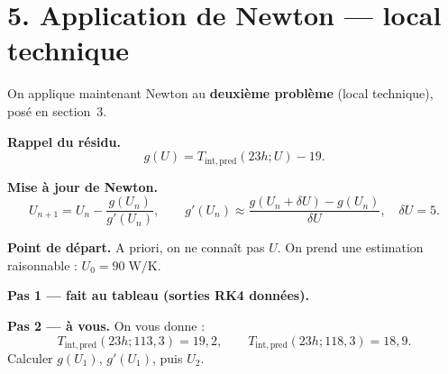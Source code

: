 \section*{5. Application de Newton --- local technique}

On applique maintenant Newton au \textbf{deuxième problème}
(local technique), posé en section~3.

\medskip

\textbf{Rappel du résidu.}
\[
  g(U)=T_{\mathrm{int,pred}}(23h;U)-19.
\]

\textbf{Mise à jour de Newton.}
\[
  U_{n+1}=U_n-\frac{g(U_n)}{g'(U_n)},
  \qquad
  g'(U_n)\approx\frac{g(U_n+\delta U)-g(U_n)}{\delta U},
  \quad \delta U=5.
\]

\medskip

\textbf{Point de départ.}
A priori, on ne connaît pas $U$.
On prend une estimation raisonnable : $U_0=90\;\mathrm{W/K}$.

\medskip

\textbf{Pas 1 --- fait au tableau (sorties RK4 données).}


\medskip

\textbf{Pas 2 --- à vous.}
On vous donne :
\[
  T_{\mathrm{int,pred}}(23h;113{,}3)=19{,}2,\qquad
  T_{\mathrm{int,pred}}(23h;118{,}3)=18{,}9.
\]
Calculer $g(U_1)$, $g'(U_1)$, puis $U_2$.


